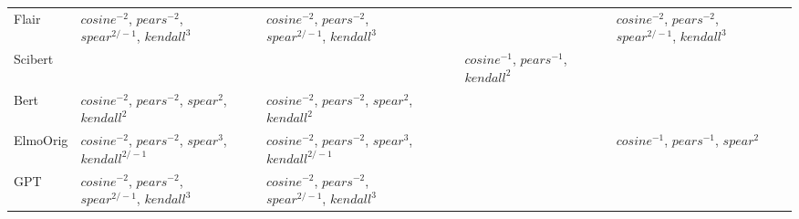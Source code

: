 \documentclass[letterpaper]{article} %
\begin{document}
\begin{sidewaystable*}
\begin{tabular}{l l l l l l l l l l l }
\midrule
\multirow{4}{1.7cm}{Flair} & \multirow{4}{1.7cm}{$cosine^{-2}$, $pears^{-2}$, $spear^{2/-1}$, $kendall^{3}$} & \multirow{4}{1.7cm}{} & \multirow{4}{1.7cm}{$cosine^{-2}$, $pears^{-2}$, $spear^{2/-1}$, $kendall^{3}$} & \multirow{4}{1.7cm}{} & \multirow{4}{1.7cm}{} & \multirow{4}{1.7cm}{} & \multirow{4}{1.7cm}{} & \multirow{4}{1.7cm}{} & \multirow{4}{1.7cm}{$cosine^{-2}$, $pears^{-2}$, $spear^{2/-1}$, $kendall^{3}$} & \multirow{4}{1.7cm}{} \\ \\ \\ \\
\midrule
\multirow{4}{1.7cm}{Scibert} & \multirow{4}{1.7cm}{} & \multirow{4}{1.7cm}{} & \multirow{4}{1.7cm}{} & \multirow{4}{1.7cm}{} & \multirow{4}{1.7cm}{} & \multirow{4}{1.7cm}{$cosine^{-1}$, $pears^{-1}$, $kendall^{2}$} & \multirow{4}{1.7cm}{} & \multirow{4}{1.7cm}{} & \multirow{4}{1.7cm}{} & \multirow{4}{1.7cm}{} \\ \\ \\ \\ 
\midrule
\multirow{4}{1.7cm}{Bert} & \multirow{4}{1.7cm}{$cosine^{-2}$, $pears^{-2}$, $spear^{2}$, $kendall^{2}$} & \multirow{4}{1.7cm}{} & \multirow{4}{1.7cm}{$cosine^{-2}$, $pears^{-2}$, $spear^{2}$, $kendall^{2}$} & \multirow{4}{1.7cm}{} & \multirow{4}{1.7cm}{} & \multirow{4}{1.7cm}{} & \multirow{4}{1.7cm}{} & \multirow{4}{1.7cm}{} & \multirow{4}{1.7cm}{} & \multirow{4}{1.7cm}{} \\ \\ \\ \\ 
\midrule
\multirow{4}{1.7cm}{ElmoOrig} & \multirow{4}{1.7cm}{$cosine^{-2}$, $pears^{-2}$, $spear^{3}$, $kendall^{2/-1}$} & \multirow{4}{1.7cm}{} & \multirow{4}{1.7cm}{$cosine^{-2}$, $pears^{-2}$, $spear^{3}$, $kendall^{2/-1}$} & \multirow{4}{1.7cm}{} & \multirow{4}{1.7cm}{} & \multirow{4}{1.7cm}{} & \multirow{4}{1.7cm}{} & \multirow{4}{1.7cm}{} & \multirow{4}{1.7cm}{$cosine^{-1}$, $pears^{-1}$, $spear^{2}$} & \multirow{4}{1.7cm}{} \\ \\ \\ \\ 
\midrule
\multirow{4}{1.7cm}{GPT} & \multirow{4}{1.7cm}{$cosine^{-2}$, $pears^{-2}$, $spear^{2/-1}$, $kendall^{3}$} & \multirow{4}{1.7cm}{} & \multirow{4}{1.7cm}{$cosine^{-2}$, $pears^{-2}$, $spear^{2/-1}$, $kendall^{3}$} & \multirow{4}{1.7cm}{} & \multirow{4}{1.7cm}{} & \multirow{4}{1.7cm}{} & \multirow{4}{1.7cm}{} & \multirow{4}{1.7cm}{} & \multirow{4}{1.7cm}{} & \multirow{4}{1.7cm}{} \\ \\ \\ \\ 

\end{tabular}
\end{sidewaystable*}
\end{document}
